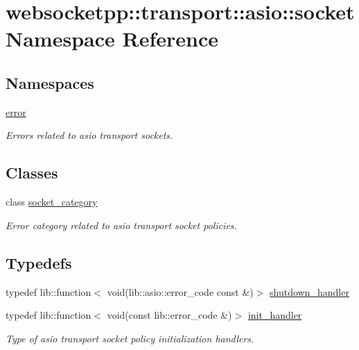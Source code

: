 \hypertarget{namespacewebsocketpp_1_1transport_1_1asio_1_1socket}{}\section{websocketpp\+:\+:transport\+:\+:asio\+:\+:socket Namespace Reference}
\label{namespacewebsocketpp_1_1transport_1_1asio_1_1socket}
\subsection*{Namespaces}
\begin{DoxyCompactItemize}
\item 
 \hyperlink{namespacewebsocketpp_1_1transport_1_1asio_1_1socket_1_1error}{error}
\begin{DoxyCompactList}\small\item\em Errors related to asio transport sockets. \end{DoxyCompactList}\end{DoxyCompactItemize}
\subsection*{Classes}
\begin{DoxyCompactItemize}
\item 
class \hyperlink{classwebsocketpp_1_1transport_1_1asio_1_1socket_1_1socket__category}{socket\+\_\+category}
\begin{DoxyCompactList}\small\item\em Error category related to asio transport socket policies. \end{DoxyCompactList}\end{DoxyCompactItemize}
\subsection*{Typedefs}
\begin{DoxyCompactItemize}
\item 
typedef lib\+::function$<$ void(lib\+::asio\+::error\+\_\+code const \&)$>$ \hyperlink{namespacewebsocketpp_1_1transport_1_1asio_1_1socket_a864ed8b0d8fa1a92a5f016c112efc4ad}{shutdown\+\_\+handler}
\item 
typedef lib\+::function$<$ void(const lib\+::error\+\_\+code \&)$>$ \hyperlink{namespacewebsocketpp_1_1transport_1_1asio_1_1socket_a2eda0fed502e748230883016b3fb3e82}{init\+\_\+handler}
\begin{DoxyCompactList}\small\item\em Type of asio transport socket policy initialization handlers. \end{DoxyCompactList}\end{DoxyCompactItemize}
